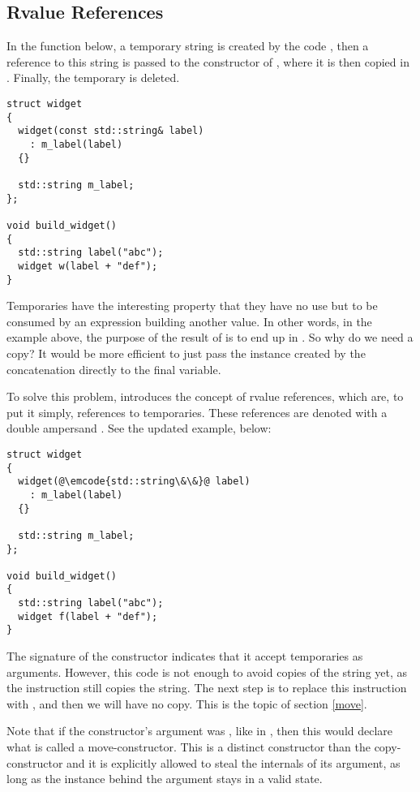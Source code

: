 \subsection{Rvalue References}

\problemtitle

In the function  below, a temporary string is
created by the code , then a reference to this
string is passed to the constructor of , where it is then
copied in . Finally, the temporary is deleted.

\begin{lstlisting}
struct widget
{
  widget(const std::string& label)
    : m_label(label)
  {}

  std::string m_label;
};

void build_widget()
{
  std::string label("abc");
  widget w(label + "def");
}
\end{lstlisting}

Temporaries have the interesting property that they have no use but to
be consumed by an expression building another value. In other words,
in the example above, the purpose of the result of  is to end up in . So why do we need a
copy? It would be more efficient to just pass the instance created by
the concatenation directly to the final variable.

\solutiontitle

To solve this problem,  introduces the concept of rvalue
references, which are, to put it simply, references to
temporaries. These references are denoted with a double ampersand
\code{\&\&}. See the updated example, below:

\begin{lstlisting}
struct widget
{
  widget(@\emcode{std::string\&\&}@ label)
    : m_label(label)
  {}

  std::string m_label;
};

void build_widget()
{
  std::string label("abc");
  widget f(label + "def");
}
\end{lstlisting}

The signature of the constructor indicates that it accept temporaries
as arguments. However, this code is not enough to avoid copies of the
string yet, as the instruction  still copies the
string. The next step is to replace this instruction with
, and then we will have no copy. This
is the topic of section \ref{move}.

Note that if the constructor's argument was , like in
, then this would declare what is called
a move-constructor. This is a distinct constructor than the
copy-constructor and it is explicitly allowed to steal the internals
of its argument, as long as the instance behind the argument stays in
a valid state.

